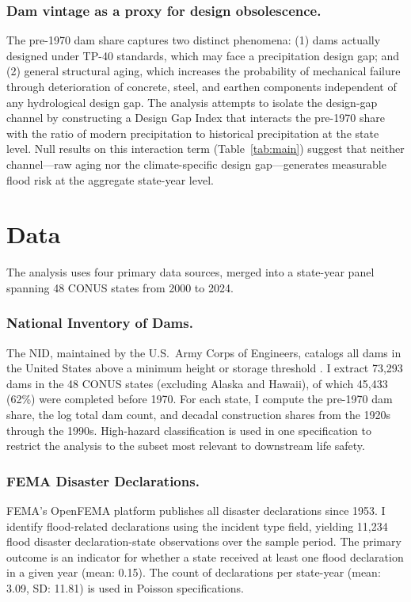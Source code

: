 \documentclass[12pt]{article}
\begin{document}
\subsubsection*{Dam vintage as a proxy for design obsolescence.}

The pre-1970 dam share captures two distinct phenomena: (1) dams actually designed under TP-40 standards, which may face a precipitation design gap; and (2) general structural aging, which increases the probability of mechanical failure through deterioration of concrete, steel, and earthen components independent of any hydrological design gap. The analysis attempts to isolate the design-gap channel by constructing a Design Gap Index that interacts the pre-1970 share with the ratio of modern precipitation to historical precipitation at the state level. Null results on this interaction term (Table~\ref{tab:main}) suggest that neither channel---raw aging nor the climate-specific design gap---generates measurable flood risk at the aggregate state-year level.

\section{Data}

The analysis uses four primary data sources, merged into a state-year panel spanning 48 CONUS states from 2000 to 2024.

\subsubsection*{National Inventory of Dams.}

The NID, maintained by the U.S.~Army Corps of Engineers, catalogs all dams in the United States above a minimum height or storage threshold \citep{usace2023}. I extract 73,293 dams in the 48 CONUS states (excluding Alaska and Hawaii), of which 45,433 (62\%) were completed before 1970. For each state, I compute the pre-1970 dam share, the log total dam count, and decadal construction shares from the 1920s through the 1990s. High-hazard classification is used in one specification to restrict the analysis to the subset most relevant to downstream life safety.

\subsubsection*{FEMA Disaster Declarations.}

FEMA's OpenFEMA platform publishes all disaster declarations since 1953. I identify flood-related declarations using the incident type field, yielding 11,234 flood disaster declaration-state observations over the sample period. The primary outcome is an indicator for whether a state received at least one flood declaration in a given year (mean: 0.15). The count of declarations per state-year (mean: 3.09, SD: 11.81) is used in Poisson specifications.
\end{document}
